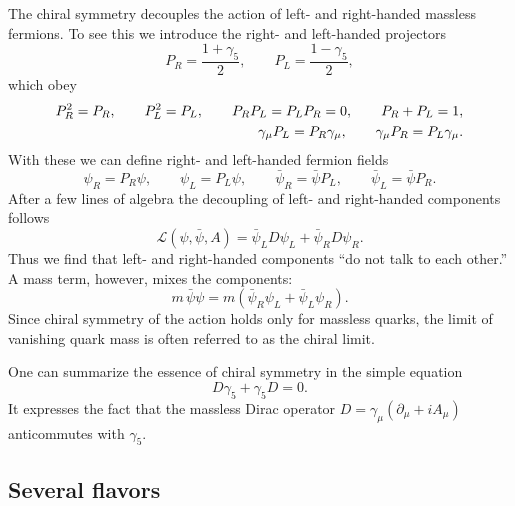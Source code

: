 The chiral symmetry decouples the action of left- and right-handed massless
fermions. To see this we introduce the right- and left-handed projectors
\begin{equation}
  P_R = \frac{1+\gamma_5}{2},
  \qquad
  P_L = \frac{1-\gamma_5}{2},
\end{equation}
which obey
\begin{align}
  P_R^2 = P_R,\qquad P_L^2 = P_L, \qquad P_R P_L = P_L P_R = 0, \qquad P_R + P_L = 1,
  \notag\\
  \gamma_\mu P_L = P_R\gamma_\mu, \qquad \gamma_\mu P_R = P_L\gamma_\mu .
\end{align}
With these we can define right- and left-handed fermion fields
\begin{equation}
  \psi_R = P_R\psi, \qquad \psi_L = P_L\psi,
  \qquad
  \bar\psi_R = \bar\psi P_L, \qquad \bar\psi_L = \bar\psi P_R .
\end{equation}
After a few lines of algebra the decoupling of left- and right-handed
components follows
\begin{equation}
  \mathcal{L}(\psi,\bar\psi,A) = \bar\psi_L D\psi_L + \bar\psi_R D\psi_R .
\end{equation}
Thus we find that left- and right-handed components ``do not talk to each
other.'' A mass term, however, mixes the components:
\begin{equation}
  m\,\bar\psi\psi = m\left(\bar\psi_R\psi_L + \bar\psi_L\psi_R\right).
\end{equation}
Since chiral symmetry of the action holds only for massless quarks, the limit
of vanishing quark mass is often referred to as the chiral limit.

One can summarize the essence of chiral symmetry in the simple equation
\begin{equation}
  D\gamma_5 + \gamma_5 D = 0 .
\end{equation}
It expresses the fact that the massless Dirac operator
$D = \gamma_\mu(\partial_\mu + iA_\mu)$ anticommutes with $\gamma_5$.

\subsection{Several flavors}

